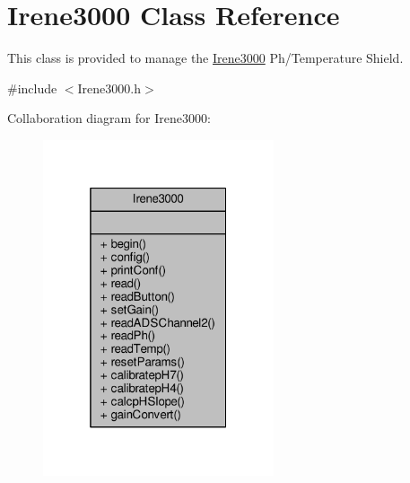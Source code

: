 \hypertarget{class_irene3000}{}\section{Irene3000 Class Reference}
\label{class_irene3000}


This class is provided to manage the \hyperlink{class_irene3000}{Irene3000} Ph/\+Temperature Shield.  




{\ttfamily \#include $<$Irene3000.\+h$>$}



Collaboration diagram for Irene3000\+:
\nopagebreak
\begin{figure}[H]
\begin{center}
\leavevmode
\includegraphics[width=193pt]{da/d7b/class_irene3000__coll__graph}
\end{center}
\end{figure}
